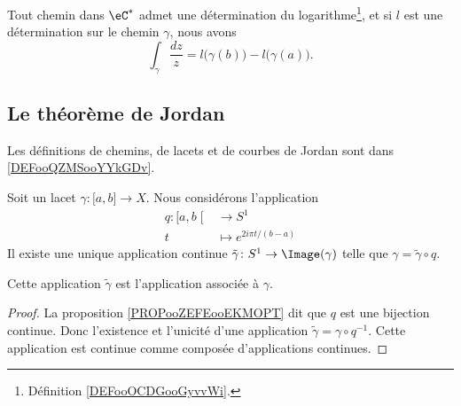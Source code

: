 \begin{theorem}     \label{THOooUPANooMiECqe}
    Tout chemin dans \( \eC^*\) admet une détermination du logarithme\footnote{Définition \ref{DEFooOCDGooGyvvWi}.}, et si \( l\) est une détermination sur le chemin \( \gamma\), nous avons
    \begin{equation}
        \int_{\gamma}\frac{ dz }{ z }=l\big( \gamma(b) \big)-l\big( \gamma(a) \big).
    \end{equation}
\end{theorem}


\subsection{Le théorème de Jordan}

Les définitions de chemins, de lacets et de courbes de Jordan sont dans \ref{DEFooQZMSooYYkGDv}.

\begin{lemmaDef}     \label{LEMooZPRLooJPvrOE}
    Soit un lacet \( \gamma\colon \mathopen[ a , b \mathclose]\to X\). Nous considérons l'application
    \begin{equation}
        \begin{aligned}
            q\colon \mathopen[ a , b \mathclose[&\to S^1 \\
            t&\mapsto  e^{2i\pi t/(b-a)} 
        \end{aligned}
    \end{equation}
    Il existe une unique application continue \( \tilde \gamma\colon S^1\to \Image(\gamma)\) telle que \( \gamma=\tilde \gamma\circ q\).

    Cette application \( \tilde \gamma\) est l'application  associée à \( \gamma\).
\end{lemmaDef}

\begin{proof}
    La proposition \ref{PROPooZEFEooEKMOPT} dit que \( q\) est une bijection continue. Donc l'existence et l'unicité d'une application \( \tilde \gamma=\gamma\circ q^{-1}\). Cette application est continue comme composée d'applications continues.
\end{proof}

